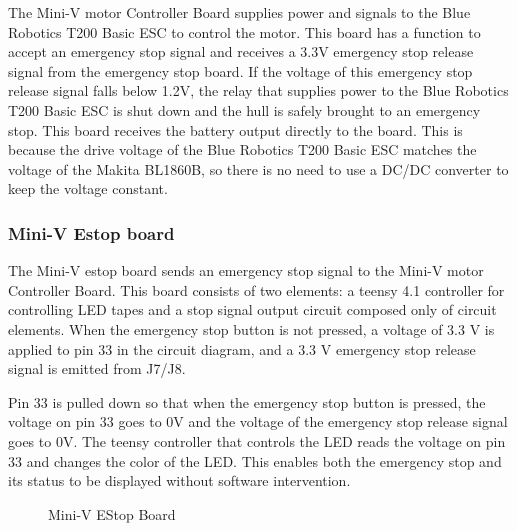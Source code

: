 \documentclass[lettersize,journal]{IEEEtran}
\begin{document}
The Mini-V motor Controller Board supplies power and signals to the Blue Robotics T200 Basic ESC to control the motor.
This board has a function to accept an emergency stop signal and receives a 3.3V emergency stop release signal from the emergency stop board.
If the voltage of this emergency stop release signal falls below 1.2V, the relay that supplies power to the Blue Robotics T200 Basic ESC is shut down and the hull is safely brought to an emergency stop.
This board receives the battery output directly to the board.
This is because the drive voltage of the Blue Robotics T200 Basic ESC matches the voltage of the Makita BL1860B, so there is no need to use a DC/DC converter to keep the voltage constant.

\subsubsection{Mini-V Estop board}

The Mini-V estop board sends an emergency stop signal to the Mini-V motor Controller Board.
This board consists of two elements: a teensy 4.1 controller for controlling LED tapes and a stop signal output circuit composed only of circuit elements.
When the emergency stop button is not pressed, a voltage of 3.3 V is applied to pin 33 in the circuit diagram, and a 3.3 V emergency stop release signal is emitted from J7/J8.

Pin 33 is pulled down so that when the emergency stop button is pressed, the voltage on pin 33 goes to 0V and the voltage of the emergency stop release signal goes to 0V.
The teensy controller that controls the LED reads the voltage on pin 33 and changes the color of the LED.
This enables both the emergency stop and its status to be displayed without software intervention.

\begin{figure}[H]
  \begin{center}
  \end{center}
  \caption{Mini-V EStop Board}
  \label{fig:miniv_estop_board}
\end{figure}
\end{document}
